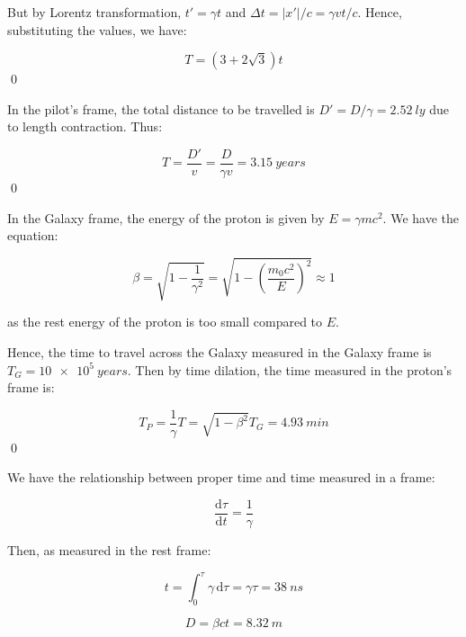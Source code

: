 \documentclass[12pt]{article}
\begin{document}
But by Lorentz transformation, $t' = \gamma t$ and $\Delta t = \left\lvert x' \right\rvert/c = \gamma v t/c$. Hence, substituting the values, we have:

\begin{equation}
    T = (3 + 2\sqrt{3}) t
\end{equation}
\qed


In the pilot's frame, the total distance to be travelled is $D' = D/\gamma = \qty{2.52}{ly}$ due to length contraction. Thus:

\begin{equation}
    T = \frac{D'}{v} = \frac{D}{\gamma v} = \qty{3.15}{years}
\end{equation}
\qed


In the Galaxy frame, the energy of the proton is given by $E = \gamma m c^{2}$. We have the equation:

\begin{equation}
    \beta = \sqrt{1 - \frac{1}{\gamma^{2}}} = \sqrt{1 - \left( \frac{m_{0} c^{2}}{E} \right)^{2}} \approx 1
\end{equation}

as the rest energy of the proton is too small compared to $E$.

Hence, the time to travel across the Galaxy measured in the Galaxy frame is $T_{G} = \qty{10e5}{years}$. Then by time dilation, the time measured in the proton's frame is:

\begin{equation}
    T_{P} = \frac{1}{\gamma} T = \sqrt{1 - \beta^{2}} T_{G} = \qty{4.93}{min}
\end{equation}
\qed



We have the relationship between proper time and time measured in a frame:

\begin{equation}
    \frac{\mathrm{d}\tau}{\mathrm{d}t} = \frac{1}{\gamma}
\end{equation}

Then, as measured in the rest frame:

\begin{equation}
    t = \int_{0}^{\tau} \gamma \, \mathrm{d}\tau = \gamma \tau = \qty{38}{ns}
\end{equation}


\begin{equation}
    D = \beta c t = \qty{8.32}{m}
\end{equation}
\end{document}
